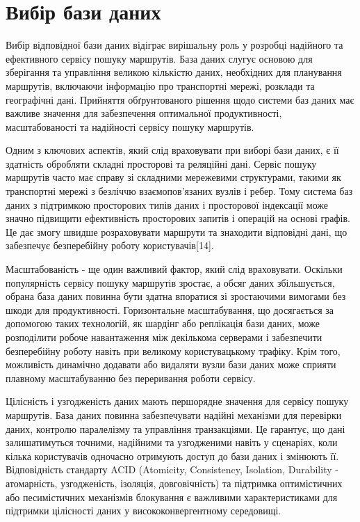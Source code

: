\section{Вибір бази даних}
\label{sec:frameworks}

Вибір відповідної бази даних відіграє вирішальну роль у розробці надійного та ефективного сервісу пошуку маршрутів. База даних слугує основою для зберігання та управління великою кількістю даних, необхідних для планування маршрутів, включаючи інформацію про транспортні мережі, розклади та географічні дані. Прийняття обґрунтованого рішення щодо системи баз даних має важливе значення для забезпечення оптимальної продуктивності, масштабованості та надійності сервісу пошуку маршрутів.

Одним з ключових аспектів, який слід враховувати при виборі бази даних, є її здатність обробляти складні просторові та реляційні дані. Сервіс пошуку маршрутів часто має справу зі складними мережевими структурами, такими як транспортні мережі з безліччю взаємопов'язаних вузлів і ребер. Тому система баз даних з підтримкою просторових типів даних і просторової індексації може значно підвищити ефективність просторових запитів і операцій на основі графів. Це дає змогу швидше розраховувати маршрути та знаходити відповідні дані, що забезпечує безперебійну роботу користувачів[14].

Масштабованість - ще один важливий фактор, який слід враховувати. Оскільки популярність сервісу пошуку маршрутів зростає, а обсяг даних збільшується, обрана база даних повинна бути здатна впоратися зі зростаючими вимогами без шкоди для продуктивності. Горизонтальне масштабування, що досягається за допомогою таких технологій, як шардінг або реплікація бази даних, може розподілити робоче навантаження між декількома серверами і забезпечити безперебійну роботу навіть при великому користувацькому трафіку. Крім того, можливість динамічно додавати або видаляти вузли бази даних може сприяти плавному масштабуванню без переривання роботи сервісу.

Цілісність і узгодженість даних мають першорядне значення для сервісу пошуку маршрутів. База даних повинна забезпечувати надійні механізми для перевірки даних, контролю паралелізму та управління транзакціями. Це гарантує, що дані залишатимуться точними, надійними та узгодженими навіть у сценаріях, коли кілька користувачів одночасно отримують доступ до бази даних і змінюють її. Відповідність стандарту ACID (Atomicity, Consistency, Isolation, Durability - атомарність, узгодженість, ізоляція, довговічність) та підтримка оптимістичних або песимістичних механізмів блокування є важливими характеристиками для підтримки цілісності даних у висококонвергентному середовищі.








